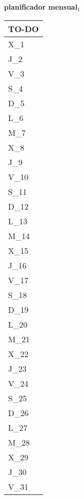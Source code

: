 \clearpage
\raggedright{
	\fontsize{25}{50}\selectfont
	\textbf{\NextYear}
}\scriptsize{\textbf{planificador mensual$_1$}}\\[11.3pt]



	\noindent\dotfill
	\renewcommand{\arraystretch}{1.5}\scriptsize
		\begin{longtabu} to \textwidth { X[l]}
		\centering \small{\textbf{TO-DO}} \\
		\toprule
		X_{1} \dotfill\\
		J_{2} \dotfill\\
		V_{3} \dotfill\\
		S_{4} \dotfill\\
		D_{5} \dotfill\\
		\hline
		L_{6} \dotfill\\
		M_{7} \dotfill\\
		X_{8} \dotfill\\
		J_{9} \dotfill\\
		V_{10} \dotfill\\
		S_{11} \dotfill\\
		D_{12} \dotfill\\
		\hline
		L_{13} \dotfill\\
		M_{14} \dotfill\\
		X_{15} \dotfill\\
		J_{16} \dotfill\\
		V_{17} \dotfill\\
		S_{18} \dotfill\\
		D_{19} \dotfill\\
		\hline
		L_{20} \dotfill\\
		M_{21} \dotfill\\
		X_{22} \dotfill\\
		J_{23} \dotfill\\
		V_{24} \dotfill\\
		S_{25} \dotfill\\
		D_{26} \dotfill\\
		\hline
		L_{27} \dotfill\\
		M_{28} \dotfill\\
		X_{29} \dotfill\\
		J_{30} \dotfill\\
		V_{31} \dotfill\\

		\bottomrule

	\end{longtabu}


\clearpage
